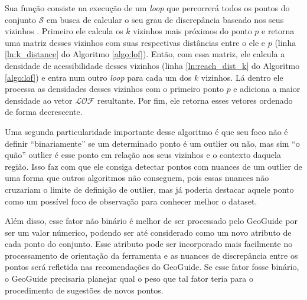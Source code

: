 Sua função consiste na execução de um \textit{loop} que percorrerá todos os pontos do conjunto $\mathcal{S}$ em busca de calcular o seu grau de discrepância baseado nos seus vizinhos \cite{DBLP:conf:AlshawabkehJK10}. Primeiro ele calcula os $k$ vizinhos mais próximos do ponto $p$ e retorna uma matriz desses vizinhos com suas respectivas distâncias entre o ele e $p$ (linha \ref{ln:k_distance} do Algoritmo \ref{algo:lof}). Então, com essa matriz, ele calcula a densidade de acessibilidade desses vizinhos (linha \ref{ln:reach_dist_k} do Algoritmo \ref{algo:lof}) e entra num outro \textit{loop} para cada um dos $k$ vizinhos. Lá dentro ele processa as densidades desses vizinhos com o primeiro ponto $p$ e adiciona a maior densidade ao vetor $\mathcal{LOF}$ resultante. Por fim, ele retorna esses vetores ordenado de forma decrescente. 

Uma segunda particularidade importante desse algoritmo é que seu foco não é definir ``binariamente'' se um determinado ponto é um outlier ou não, mas sim ``o quão'' outlier é esse ponto em relação aos seus vizinhos e o contexto daquela região. Isso faz com que ele consiga detectar pontos com nuances de um outlier de uma forma que outros algoritmos não conseguem, pois essas nuances não cruzariam o limite de definição de outlier, mas já poderia destacar aquele ponto como um possível foco de observação para conhecer melhor o dataset.

Além disso, esse fator não binário é melhor de ser processado pelo GeoGuide por ser um valor númerico, podendo ser até considerado como um novo atributo de cada ponto do conjunto. Esse atributo pode ser incorporado mais facilmente no processamento de orientação da ferramenta e as nuances de discrepância entre os pontos será refletida nas recomendações do GeoGuide. Se esse fator fosse binário, o GeoGuide precisaria planejar qual o peso que tal fator teria para o procedimento de sugestões de novos pontos.
